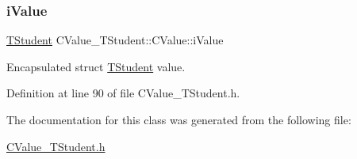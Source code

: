 \subsubsection{\texorpdfstring{i\+Value}{iValue}}
{\footnotesize\ttfamily \hyperlink{struct_c_value___t_student_1_1_t_student}{T\+Student} C\+Value\+\_\+\+T\+Student\+::\+C\+Value\+::i\+Value\hspace{0.3cm}{\ttfamily [private]}}



Encapsulated {\ttfamily struct} \hyperlink{struct_c_value___t_student_1_1_t_student}{T\+Student} value. 



Definition at line 90 of file C\+Value\+\_\+\+T\+Student.\+h.



The documentation for this class was generated from the following file\+:\begin{DoxyCompactItemize}
\item 
\hyperlink{_c_value___t_student_8h}{C\+Value\+\_\+\+T\+Student.\+h}\end{DoxyCompactItemize}
